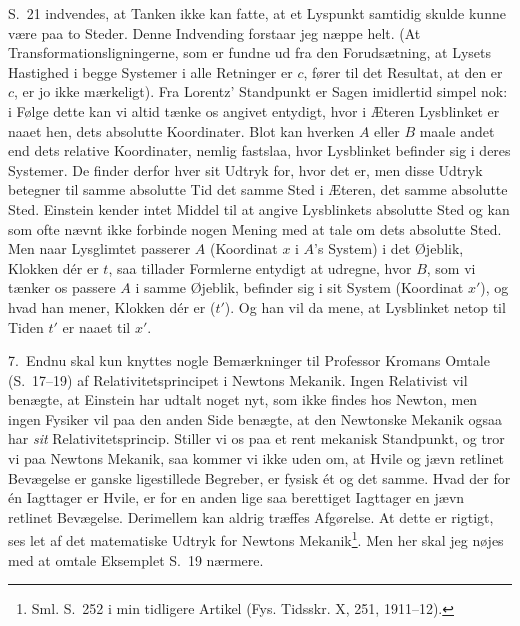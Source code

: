 \documentclass[12pt,a4paper]{article}
\newcommand{\opage}[1]{\marginnote{\footnotesize\textit{[#1]}}}
\begin{document}
S.~21 indvendes, at Tanken ikke kan fatte, at et Lyspunkt samtidig
skulde kunne være paa to Steder. Denne Indvending forstaar jeg næppe
helt. (At Transformationsligningerne, som er fundne ud fra den
Forudsætning, at Lysets Hastighed i begge Systemer i alle Retninger er
$c$, fører til det Resultat, at den er $c$, er jo ikke mærkeligt). Fra
Lorentz' Standpunkt er Sagen imidlertid simpel nok: i Følge dette kan
vi altid tænke os angivet entydigt, hvor i Æteren Lysblinket er naaet
hen, dets absolutte Koordinater. Blot kan hverken $A$ eller $B$ maale
andet end dets relative Koordinater, nemlig fastslaa, hvor Lysblinket
befinder sig i deres Systemer. De finder derfor hver sit Udtryk for,
hvor det er, men disse Udtryk betegner til samme absolutte Tid det
samme Sted i Æteren, det samme absolutte Sted. Einstein kender intet
Middel til at angive Lysblinkets absolutte Sted og kan som ofte nævnt
ikke forbinde nogen Mening med at tale om dets absolutte Sted. Men naar
Lysglimtet passerer $A$ (Koordinat $x$ i $A$'s System) i det Øjeblik,
Klokken dér er $t$, saa tillader Formlerne entydigt at udregne, hvor
$B$, som vi tænker os passere $A$ i samme Øjeblik, befinder sig i sit
System (Koordinat $x'$), og hvad han mener, Klokken dér er ($t'$). Og
han vil da mene, at Lysblinket netop til Tiden $t'$ er naaet til $x'$.

7.\ Endnu skal kun knyttes nogle Bemærkninger til Professor Kromans
Omtale (S.~17--19) af Relativitetsprincipet i Newtons Mekanik. Ingen
Relativist vil benægte, at Einstein har udtalt noget nyt, som ikke
findes hos Newton, men ingen Fysiker vil paa den anden Side benægte, at
den Newtonske Mekanik ogsaa har \emph{sit} Relativitetsprincip. Stiller
vi os paa et rent mekanisk Standpunkt, og tror vi
\opage{27} %
\setcounter{footnote}{0}%
paa Newtons Mekanik, saa kommer vi ikke uden om, at Hvile og jævn
retlinet Bevægelse er ganske ligestillede Begreber, er \guillemotright
fysisk ét og det samme\guillemotleft . Hvad der for én Iagttager er
Hvile, er for en anden lige saa berettiget Iagttager en jævn retlinet
Bevægelse. Derimellem kan aldrig træffes Afgørelse. At dette er
rigtigt, ses let af det matematiske Udtryk for Newtons
Mekanik\footnote{Sml. S.~252 i min tidligere Artikel (Fys. Tidsskr. X,
251, 1911--12).}. Men her skal jeg nøjes med at omtale Eksemplet S.~19
nærmere.
\end{document}
